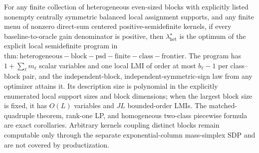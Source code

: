 For any finite collection of heterogeneous even-sized blocks with explicitly listed nonempty centrally symmetric balanced local assignment supports, and any finite menu of nonzero direct-sum centered positive-semidefinite kernels, if every baseline-to-oracle gain denominator is positive, then \(\lambda_{\mathrm{het}}^\star\) is the optimum of the explicit local semidefinite program in \(\mathrm{thm:heterogeneous-block-psd-finite-class-frontier}\).  The program has \(1+\sum_\ell m_\ell\) scalar variables and one local LMI of order at most \(b_\ell-1\) per class--block pair, and the independent-block, independent-symmetric-sign law from any optimizer attains it.  Its description size is polynomial in the explicitly enumerated local support sizes and block dimensions; when the largest block size is fixed, it has \(O(L)\) variables and \(JL\) bounded-order LMIs.  The matched-quadruple theorem, rank-one LP, and homogeneous two-class piecewise formula are exact corollaries.  Arbitrary kernels coupling distinct blocks remain computable only through the separate exponential-column mass-simplex SDP and are not covered by productization.